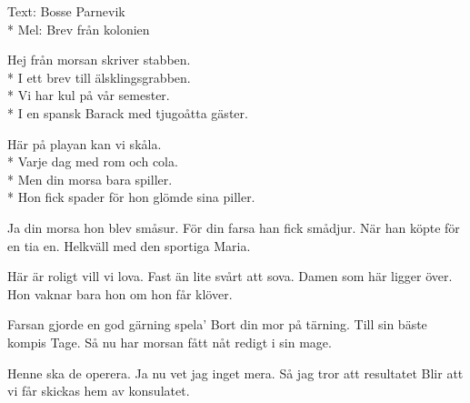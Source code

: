 \begin{SongText}
    \begin{SongInfo}
        Text: Bosse Parnevik\\*%
        Mel: Brev från kolonien
    \end{SongInfo}
    \begin{SongVerse}
        Hej från morsan skriver stabben.\\*%
        I ett brev till älsklingsgrabben.\\*%
        Vi har kul på vår semester.\\*%
        I en spansk Barack med tjugoåtta gäster.
    \end{SongVerse}
    \begin{SongVerse}
        Här på playan kan vi skåla.\\*%
        Varje dag med rom och cola.\\*%
        Men din morsa bara spiller.\\*%
        Hon fick spader för hon glömde sina piller.
    \end{SongVerse}
    \begin{SongVerse}
        Ja din morsa hon blev småsur.
        För din farsa han fick smådjur.
        När han köpte för en tia en. 
        Helkväll med den sportiga Maria.
    \end{SongVerse}
    \begin{SongVerse}
        Här är roligt vill vi lova. 
        Fast än lite svårt att sova.
        Damen som här ligger över.
        Hon vaknar bara hon om hon får klöver.
    \end{SongVerse}
    \begin{SongVerse}
        Farsan gjorde en god gärning spela’ 
        Bort din mor på tärning. 
        Till sin bäste kompis Tage.
        Så nu har morsan fått nåt redigt i sin mage.
    \end{SongVerse}
    \begin{SongVerse}
        Henne ska de operera. 
        Ja nu vet jag inget mera. 
        Så jag tror att resultatet 
        Blir att vi får skickas hem av konsulatet.
    \end{SongVerse}
\end{SongText}